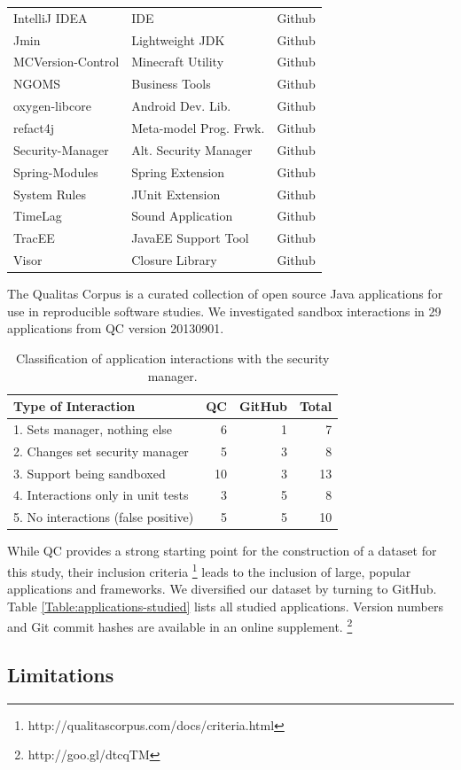 \documentclass{sig-alternate}
\begin{document}
\begin{table}
\begin{tabular}{lll}
IntelliJ IDEA & IDE & Github\tabularnewline
Jmin & Lightweight JDK & Github\tabularnewline
MCVersion-Control & Minecraft Utility & Github\tabularnewline
NGOMS & Business Tools & Github\tabularnewline
oxygen-libcore & Android Dev. Lib. & Github\tabularnewline
refact4j & Meta-model Prog. Frwk. & Github\tabularnewline
Security-Manager & Alt. Security Manager & Github\tabularnewline
Spring-Modules & Spring Extension & Github\tabularnewline
System Rules & JUnit Extension & Github\tabularnewline
TimeLag & Sound Application & Github\tabularnewline
TracEE & JavaEE Support Tool & Github\tabularnewline
Visor & Closure Library & Github\tabularnewline
\bottomrule
\end{tabular}
\end{table}


The Qualitas Corpus is a curated collection of open source Java applications
for use in reproducible software studies. We investigated sandbox
interactions in 29 applications from QC version 20130901.

\begin{table}
\caption{Classification of application interactions with the security manager.}
\label{tab:Classification-of-Application}

\centering{}%
\begin{tabular}{lrrr}
\toprule 
Type of Interaction & QC & GitHub & Total\tabularnewline
\midrule
1. Sets manager, nothing else & 6 & 1 & 7\tabularnewline
2. Changes set security manager & 5 & 3 & 8\tabularnewline
3. Support being sandboxed & 10 & 3 & 13\tabularnewline
4. Interactions only in unit tests & 3 & 5 & 8\tabularnewline
5. No interactions (false positive) & 5 & 5 & 10\tabularnewline
\bottomrule
\end{tabular}
\end{table}


While QC provides a strong starting point for the construction of
a dataset for this study, their inclusion criteria%
\footnote{http://qualitascorpus.com/docs/criteria.html%
} leads to the inclusion of large, popular applications and frameworks.
We diversified our dataset by turning to GitHub. Table \ref{Table:applications-studied}
lists all studied applications. Version numbers and Git commit hashes
are available in an online supplement.%
\footnote{http://goo.gl/dtcqTM%
}

\subsection{Limitations}\label{sub:Limitations-Study}
\end{document}
